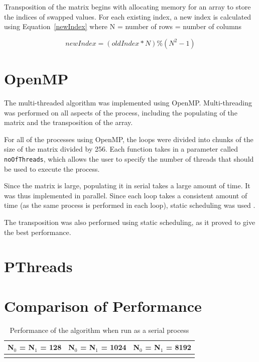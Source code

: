 \documentclass[10pt,twocolumn]{witseiepaper}
\begin{document}
Transposition of the matrix begins with allocating memory for an array to store the indices of swapped values. For each existing index, a new index is calculated using Equation~\ref{newIndex} where N = number of rows = number of columns

\begin{equation}
\label{newIndex}
newIndex = (oldIndex*N)\%(N^2-1)
\end{equation}

\section{OpenMP}
The multi-threaded algorithm was implemented using OpenMP. Multi-threading was performed on all aspects of the process, including the populating of the matrix and the transposition of the array. 

For all of the processes using OpenMP, the loops were divided into chunks of the size of the matrix divided by 256. Each function takes in a parameter called \texttt{noOfThreads}, which allows the user to specify the number of threads that should be used to execute the process.

Since the matrix is large, populating it in serial takes a large amount of time. It was thus implemented in parallel. Since each loop takes a consistent amount of time (as the same process is performed in each loop), static scheduling was used \cite{HPC}. 

The transposition was also performed using static scheduling, as it proved to give the best performance. 

\section{PThreads}

\section{Comparison of Performance}

\begin{table}[h]
	\centering
	\caption{Performance of the algorithm when run as a serial process}
	\begin{tabular}{|c|c|c|}
	\hline
	  N$_{0}$ = N$_{1}$ = 128 &  N$_{0}$ = N$_{1}$ = 1024 & N$_{0}$ = N$_{1}$ = 8192 \\
		\hline 
		  &  &  \\ 
		\hline 
	\end{tabular} 
\end{table} 
\end{document}
